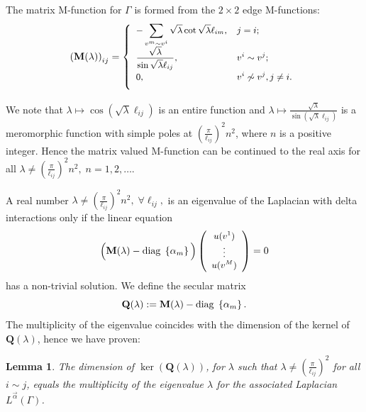 \documentclass{amsart}
\newtheorem{lemma}[theorem]{Lemma}
\theoremstyle{definition}
\theoremstyle{remark}
\numberwithin{equation}{section}
\begin{document}
The matrix M-function for $ \Gamma $ is formed from the $ 2 \times 2 $ edge M-functions:
\begin{equation}  \label{edgeM}
\small
\left(\mathbf M (\lambda) \right)_{ij} =
\left\{
\begin{array}{ll}
- \displaystyle \sum_{v^m \sim v^i} \sqrt{\lambda} \cot  \sqrt{\lambda}  \ell_{im}, & j =i; \\[3mm]
 \displaystyle \frac{ \sqrt{\lambda} }{\sin  \sqrt{\lambda}  \ell_{ij}} , & v^i \sim v^j; \\[3mm]
\displaystyle  0, &  v^i \not\sim v^j,j \neq i. \\[3mm]
 \end{array} \right.
\end{equation}

We note that $\lambda \mapsto\cos(\sqrt{\lambda }\ell_{ij})$ is an entire function and $\lambda \mapsto\frac{\sqrt{\lambda }}{\sin(\sqrt{\lambda }\ell_{ij})}$ is 
a meromorphic function with simple poles at $(\frac{\pi}{\ell_{ij}})^2n^2$, where $n$ is a positive integer.
Hence the matrix valued M-function can be continued to the real axis for all $ \lambda \neq \left( \frac{\pi}{\ell_{ij}} \right)^2n^2, \; n  = 1,2, \dots$.


A real number $ \lambda \not= \left(\frac{\pi}{\ell_{ij}}\right)^2n^2, \; \forall \ell_{ij}  ,$ is an eigenvalue
 of the Laplacian with delta interactions only if the
 linear equation \begin{equation} \label{eq7}
\small \Big( \mathbf M(\lambda) - {\rm diag}\; \left\{ \alpha_{m} \right\} \Big) 
\left(
\begin{array}{c}
 u(v^1) \\
\vdots \\
u(v^M)
\end{array}
\right)
= 0  
\end{equation}
has a non-trivial solution. We define the secular matrix
\begin{equation} \label{qq} 
\mathbf Q(\lambda):= \mathbf M(\lambda) - {\rm diag}\; \left\{ \alpha_{m} \right\}.
\end{equation}
The multiplicity of the eigenvalue coincides with the dimension of the kernel of $\mathbf Q(\lambda)$, hence we have proven:





\begin{lemma} \label{lem1}
The dimension of $\ker( \mathbf Q(\lambda))$, for $\lambda$ such that $\lambda\neq(\frac{\pi}{\ell_{ij}})^2$ for all $i\sim j$, equals the multiplicity of the eigenvalue $\lambda $ for the associated Laplacian $L^{\vec \alpha}(\Gamma)$.
\end{lemma}
\end{document}
